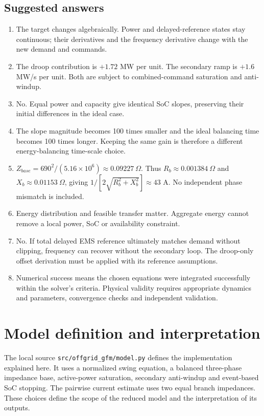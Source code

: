 \documentclass[11pt,a4paper]{article}
\begin{document}
\subsection*{Suggested answers}
\begin{enumerate}
\item The target changes algebraically. Power and delayed-reference states stay continuous; their derivatives and the frequency derivative change with the new demand and commands.
\item The droop contribution is $+1.72$ MW per unit. The secondary ramp is $+1.6$ MW/s per unit. Both are subject to combined-command saturation and anti-windup.
\item No. Equal power and capacity give identical SoC slopes, preserving their initial differences in the ideal case.
\item The slope magnitude becomes 100 times smaller and the ideal balancing time becomes 100 times longer. Keeping the same gain is therefore a different energy-balancing time-scale choice.
\item $Z_{base}=690^2/(5.16\times10^6)\approx0.09227\ \Omega$. Thus $R_b\approx0.001384\ \Omega$ and $X_b\approx0.01153\ \Omega$, giving $1/[2\sqrt{R_b^2+X_b^2}]\approx43$ A. No independent phase mismatch is included.
\item Energy distribution and feasible transfer matter. Aggregate energy cannot remove a local power, SoC or availability constraint.
\item No. If total delayed EMS reference ultimately matches demand without clipping, frequency can recover without the secondary loop. The droop-only offset derivation must be applied with its reference assumptions.
\item Numerical success means the chosen equations were integrated successfully within the solver's criteria. Physical validity requires appropriate dynamics and parameters, convergence checks and independent validation.
\end{enumerate}

\appendix
\section{Model definition and interpretation}
The local source \texttt{src/offgrid\_gfm/model.py} defines the implementation explained here. It uses a normalized swing equation, a balanced three-phase impedance base, active-power saturation, secondary anti-windup and event-based SoC stopping. The pairwise current estimate uses two equal branch impedances. These choices define the scope of the reduced model and the interpretation of its outputs.
\end{document}
